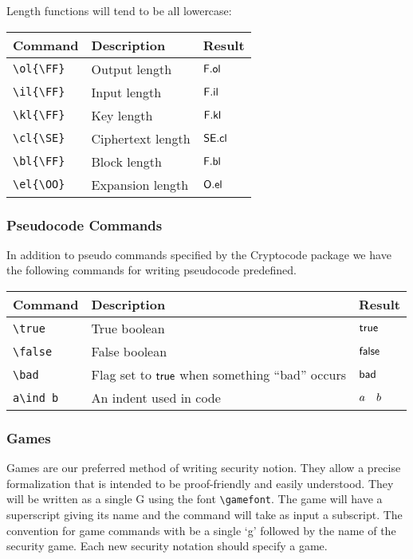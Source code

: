 \documentclass[11pt,twoside]{report}
\begin{document}
Length functions will tend to be all lowercase:
\begin{center}
\begin{tabular}{l l l}
	\textbf{Command} & \textbf{Description} & \textbf{Result} \\\hline
	\lstinline$\ol{\FF}$ & Output length & $\mathsf{F}.\mathsf{ol}$  \\
	\lstinline$\il{\FF}$ & Input length & $\mathsf{F}.\mathsf{il}$  \\
	\lstinline$\kl{\FF}$ & Key length & $\mathsf{F}.\mathsf{kl}$  \\
	\lstinline$\cl{\SE}$ & Ciphertext length & $\mathsf{SE}.\mathsf{cl}$  \\
	\lstinline$\bl{\FF}$ & Block length & $\mathsf{F}.\mathsf{bl}$  \\
	\lstinline$\el{\OO}$ & Expansion length & $\mathsf{O}.\mathsf{el}$
\end{tabular}
\end{center}

\subsubsection{Pseudocode Commands}
In addition to pseudo commands specified by the Cryptocode package we have the following commands for writing pseudocode predefined.
\begin{center}
\begin{tabular}{l l l}
	\textbf{Command} & \textbf{Description} & \textbf{Result} \\\hline
	\lstinline$\true$ & True boolean & $\mathsf{true}$  \\
	\lstinline$\false$ & False boolean & $\mathsf{false}$  \\
	\lstinline$\bad$ & Flag set to $\mathsf{true}$ when something ``bad'' occurs & $\mathsf{bad}$  \\
	\lstinline$a\ind b$ & An indent used in code & $a\hspace*{10pt} b$
\end{tabular}
\end{center}

\subsubsection{Games}
Games are our preferred method of writing security notion.
They allow a precise formalization that is intended to be proof-friendly and easily understood.
They will be written as a single G using the font \lstinline$\gamefont$.
The game will have a superscript giving its name and the command will take as input a subscript.
The convention for game commands with be a single `g' followed by the name of the security game.
Each new security notation should specify a game.
\end{document}

